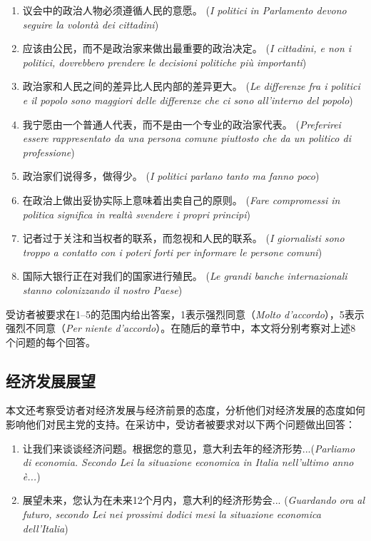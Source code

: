 \documentclass[12pt,a4paper]{ctexart}
\begin{document}
    \begin{enumerate}
        \item 议会中的政治人物必须遵循人民的意愿。 (\textit{I politici in Parlamento devono seguire la volontà dei cittadini})

        \item 应该由公民，而不是政治家来做出最重要的政治决定。 (\textit{I cittadini, e non i politici, dovrebbero prendere le decisioni politiche più importanti})

        \item 政治家和人民之间的差异比人民内部的差异更大。 (\textit{Le differenze fra i politici e il popolo sono maggiori delle differenze che ci sono all’interno del popolo})

        \item 我宁愿由一个普通人代表，而不是由一个专业的政治家代表。 (\textit{Preferirei essere rappresentato da una persona comune piuttosto che da un politico di professione})

        \item 政治家们说得多，做得少。 (\textit{I politici parlano tanto ma fanno poco})

        \item 在政治上做出妥协实际上意味着出卖自己的原则。 (\textit{Fare compromessi in politica significa in realtà svendere i propri principi})

        \item 记者过于关注和当权者的联系，而忽视和人民的联系。 (\textit{I giornalisti sono troppo a contatto con i poteri forti per informare le persone comuni})

        \item 国际大银行正在对我们的国家进行殖民。 (\textit{Le grandi banche internazionali stanno colonizzando il nostro Paese})
    \end{enumerate}

    受访者被要求在1--5的范围内给出答案，1表示强烈同意（\textit{Molto d'accordo}），5表示强烈不同意（\textit{Per niente d'accordo}）。在随后的章节中，本文将分别考察对上述8个问题的每个回答。

    \subsection{经济发展展望}

    本文还考察受访者对经济发展与经济前景的态度，分析他们对经济发展的态度如何影响他们对民主党的支持。在采访中，受访者被要求对以下两个问题做出回答：

    \begin{enumerate}
        \item 让我们来谈谈经济问题。根据您的意见，意大利去年的经济形势...(\textit{Parliamo di economia. Secondo Lei la situazione economica in Italia nell'ultimo anno è...})

        \item 展望未来，您认为在未来12个月内，意大利的经济形势会... (\textit{Guardando ora al futuro, secondo Lei nei prossimi dodici mesi la situazione economica dell'Italia})
    \end{enumerate}
\end{document}

